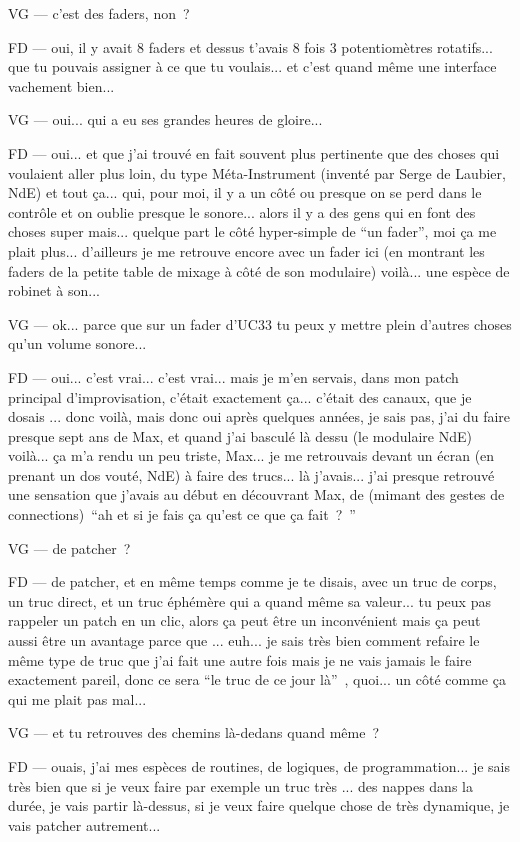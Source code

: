 VG — c'est des faders, non ? 

FD — oui, il y avait 8 faders et dessus t'avais 8 fois 3 potentiomètres rotatifs... que tu pouvais assigner à ce que tu voulais... et c'est quand même une interface vachement bien... 

VG — oui... qui a eu ses grandes heures de gloire... 

FD — oui... et que j'ai trouvé en fait souvent plus pertinente que des choses qui voulaient aller plus loin, du type Méta-Instrument (inventé par Serge de Laubier, NdE) et tout ça... qui, pour moi, il y a un côté ou presque on se perd dans le contrôle et on oublie presque le sonore... alors il y a des gens qui en font des choses super mais... quelque part le côté hyper-simple de ``un fader'', moi ça me plait plus... d'ailleurs je me retrouve encore avec un fader ici (en montrant les faders de la petite table de mixage à côté de son modulaire) voilà... une espèce de robinet à son... 

VG — ok... parce que sur un fader d'UC33 tu peux y mettre plein d'autres choses qu'un volume sonore... 

FD — oui... c'est vrai... c'est vrai... mais je m'en servais, dans mon patch principal d'improvisation, c'était exactement ça... c'était des canaux, que je dosais ... donc voilà, mais donc oui après quelques années, je sais pas, j'ai du faire presque sept ans de Max, et quand j'ai basculé là dessu (le modulaire NdE) voilà... ça m'a rendu un peu triste, Max... je me retrouvais devant un écran (en prenant un dos vouté, NdE) à faire des trucs... là j'avais... j'ai presque retrouvé une sensation que j'avais au début en découvrant Max, de (mimant des gestes de connections) ``ah et si je fais ça qu'est ce que ça fait ? '' 

VG — de patcher ? 

FD — de patcher, et en même temps comme je te disais, avec un truc de corps, un truc direct, et un truc éphémère qui a quand même sa valeur... tu peux pas rappeler un patch en un clic, alors ça peut être un inconvénient mais ça peut aussi être un avantage parce que ... euh... je sais très bien comment refaire le même type de truc que j'ai fait une autre fois mais je ne vais jamais le faire exactement pareil, donc ce sera ``le truc de ce jour là'' , quoi... un côté comme ça qui me plait pas mal... 

VG — et tu retrouves des chemins là-dedans quand même ? 

FD — ouais, j'ai mes espèces de routines, de logiques, de programmation... je sais très bien que si je veux faire par exemple un truc très ... des nappes dans la durée, je vais partir là-dessus, si je veux faire quelque chose de très dynamique, je vais patcher autrement... 

